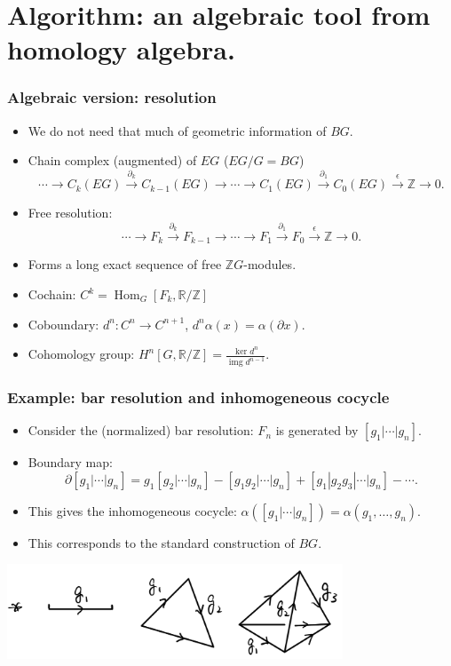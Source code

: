 \documentclass[xcolor=table, aspectratio=169]{beamer}
\newcommand{\uone}{\mathbb R/\mathbb Z}
\DeclareMathOperator{\img}{img}
\DeclareMathOperator{\hhom}{Hom}
\begin{document}
\section{Algorithm: an algebraic tool from homology algebra.}

\begin{frame}
	\frametitle{Algebraic version: resolution}
	\begin{itemize}
		\item We do not need that much of geometric information of $BG$.
		\item Chain complex (augmented) of $EG$ ($EG/G=BG$)
		\[\cdots\rightarrow C_k(EG)\xrightarrow{\partial_k}
		C_{k-1}(EG)\rightarrow\cdots\rightarrow
		C_1(EG)\xrightarrow{\partial_1}
		C_0(EG)\xrightarrow{\epsilon}\mathbb Z\rightarrow0.\]
		\item Free resolution:
		\[\cdots\rightarrow F_k\xrightarrow{\partial_k}
		F_{k-1}\rightarrow\cdots\rightarrow
		F_1\xrightarrow{\partial_1}
		F_0\xrightarrow{\epsilon}\mathbb Z\rightarrow0.\]
		\item Forms a long exact sequence of free $\mathbb ZG$-modules.
		\item Cochain: $C^k=\hhom_G[F_k, \uone]$
		\item Coboundary: $d^n:C^n\rightarrow C^{n+1}$, $d^n\alpha(x) = \alpha(\partial x)$.
		\item Cohomology group: $H^n[G, \uone]=\frac{\ker d^n}{\img d^{n-1}}$.
	\end{itemize}
\end{frame}

\begin{frame}
	\frametitle{Example: bar resolution and inhomogeneous cocycle}
	\begin{itemize}
		\item Consider the (normalized) bar resolution:
		$F_n$ is generated by $[g_1|\cdots|g_n]$.
		\item Boundary map:
		\[\partial[g_1|\cdots|g_n]=g_1[g_2|\cdots|g_n]
		-[g_1g_2|\cdots|g_n]+[g_1|g_2g_3|\cdots|g_n]-\cdots.\]
		\item This gives the inhomogeneous cocycle:
		$\alpha([g_1|\cdots|g_n])=\alpha(g_1,\ldots,g_n)$.
		\item This corresponds to the standard construction of $BG$.
	\end{itemize}
\begin{center}
	\includegraphics[width=10cm]{bg-std}
\end{center}
\end{frame}
\end{document}

